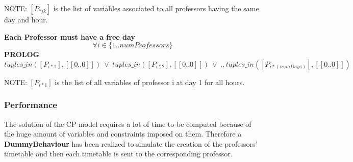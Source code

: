 NOTE: \([P_{*jk}]\) is the list of variables associated to all professors having the same day and hour.

\textbf{Each Professor must have a free day}
\[\forall i \in \{1..numProfessors\}\]
\textbf{PROLOG}
\[tuples\_in([P_{i*1}],[[0..0]]) \: \lor \: tuples\_in([P_{i*2}],[[0..0]]) \: \lor \: .. \: tuples\_in([P_{i*(numDays)}],[[0..0]])\]

NOTE: \([P_{i*1}]\) is the list of all variables of professor i at day 1 for all hours.

\subsubsection{Performance}

The solution of the CP model requires a lot of time to be computed because of the huge amount of variables and constraints imposed on them. Therefore a \textbf{DummyBehaviour} has been realized to simulate the creation of the professors' timetable and then each timetable is sent to the corresponding professor.